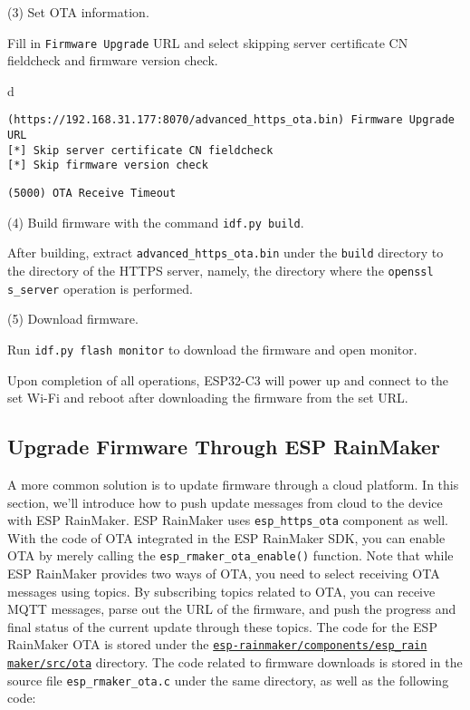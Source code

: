 \documentclass[a4paper,12pt]{book}
\begin{document}
\vspace{6pt}
(3) Set OTA information.

Fill in \verb|Firmware Upgrade| URL and select skipping server certificate CN fieldcheck and firmware version check.

\begin{codebloc}
\begin{tabular}{d}
\vspace{2pt}
\begin{verbatim}
(https://192.168.31.177:8070/advanced_https_ota.bin) Firmware Upgrade URL
[*] Skip server certificate CN fieldcheck
[*] Skip firmware version check
\end{verbatim}
\verb|(5000) OTA Receive Timeout|
\end{tabular}
\end{codebloc}

\vspace{6pt}
(4) Build firmware with the command \verb|idf.py build|.

After building, extract \verb|advanced_https_ota.bin| under the \verb|build| directory to the directory of the HTTPS server, namely, the directory where the \verb|openssl s_server| operation is performed.

(5) Download firmware.

Run \verb|idf.py flash monitor| to download the firmware and open monitor.

Upon completion of all operations, ESP32-C3 will power up and connect to the set Wi-Fi and reboot after downloading the firmware from the set URL.

\subsection{Upgrade Firmware Through ESP RainMaker}
A more common solution is to update firmware through a cloud platform. In this section, we’ll introduce how to push update messages from cloud to the device with ESP RainMaker. ESP RainMaker uses \verb|esp_https_ota| component as well. With the code of OTA integrated in the ESP RainMaker SDK, you can enable OTA by merely calling the \verb|esp_rmaker_ota_enable()| function. Note that while ESP RainMaker provides two ways of OTA, you need to select receiving OTA messages using topics. By subscribing topics related to OTA, you can receive MQTT messages, parse out the URL of the firmware, and push the progress and final status of the current update through these topics. The code for the ESP RainMaker OTA is stored under the \href{https://github.com/espressif/esp-rainmaker/tree/master/components/esp_rainmaker/src/ota}{\texttt{esp-rainmaker/components/esp\_rain\\ maker/src/ota}} directory. The code related to firmware downloads is stored in the source file \verb|esp_rmaker_ota.c| under the same directory, as well as the following code:
\end{document}
